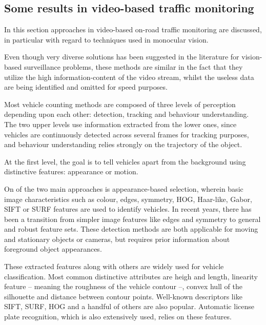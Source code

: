 \subsection{Some results in video-based traffic monitoring}
In this section approaches in video-based on-road traffic monitoring are discussed, in particular with regard to techniques used in monocular vision.

Even though very diverse solutions has been suggested in the literature for vision-based surveillance problems, these methods are similar in the fact that they utilize the high information-content of the video stream, whilst the useless data are being identified and omitted for speed purposes.

Most vehicle counting methods are composed of three levels of perception depending upon each other: detection, tracking and behaviour understanding.
The two upper levels use information extracted from the lower ones, since vehicles are continuously detected across several frames for tracking purposes, and behaviour understanding relies strongly on the trajectory of the object.

At the first level, the goal is to tell vehicles apart from the background using distinctive features: appearance or motion.

On of the two main approaches is appearance-based selection, wherein basic image characteristics such as colour\cite{Chang2005}, edges\cite{Blanc2007}, symmetry\cite{Aytekin2010}, HOG\cite{Niknejad2012}, Haar-like\cite{Sivaraman2012}, Gabor\cite{Zhang2006}, SIFT\cite{Zhang2011} or SURF\cite{Lin2012} features are used to identify vehicles.
In recent years, there has been a transition from simpler image features like edges and symmetry to general and robust feature sets\cite{Sivaraman2012}.
These detection methods are both applicable for moving and stationary objects or cameras, but requires prior information about foreground object appearances.

These extracted features along with others are widely used for vehicle classification.
Most common distinctive attributes are heigh and length\cite{Huang2004}, linearity feature -- meaning the roughness of the vehicle contour\cite{Zhang2008} --, convex hull of the silhouette\cite{Buch2010} and distance between contour points\cite{Lou2005}.
Well-known descriptors like SIFT\cite{Zhang2011}, SURF\cite{Lin2012}, HOG\cite{Niknejad2012} and a handful of others are also popular.
Automatic license plate recognition, which is also extensively used, relies on these features\cite{Luvizon2016}. 

